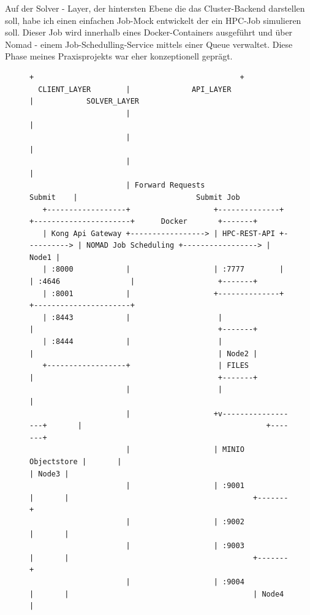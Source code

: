 \documentclass[12pt]{article}
\begin{document}
Auf der Solver - Layer, der hintersten Ebene die das Cluster-Backend darstellen soll, habe ich einen einfachen Job-Mock entwickelt der ein HPC-Job simulieren soll. Dieser Job wird innerhalb eines Docker-Containers ausgeführt und über Nomad - einem Job-Schedulling-Service mittels einer Queue verwaltet. Diese Phase meines Praxisprojekts war eher konzeptionell geprägt.

\begin{figure}[h!]
  \centering
  \begin{Verbatim}[fontsize=\tiny,frame=single]
                      +                                               +
  CLIENT_LAYER        |              API_LAYER                        |            SOLVER_LAYER
                      |                                               |
                      |                                               |
                      |                                               |
                      | Forward Requests                    Submit    |                           Submit Job
   +------------------+                   +--------------+            +----------------------+      Docker       +-------+
   | Kong Api Gateway +-----------------> | HPC-REST-API +----------> | NOMAD Job Scheduling +-----------------> | Node1 |
   | :8000            |                   | :7777        |            | :4646                |                   +-------+
   | :8001            |                   +--------------+            +----------------------+
   | :8443            |                    |                          |                                          +-------+
   | :8444            |                    |                          |                                          | Node2 |
   +------------------+                    | FILES                    |                                          +-------+
                      |                    |                          |
                      |                   +v------------------+       |                                          +-------+
                      |                   | MINIO Objectstore |       |                                          | Node3 |
                      |                   | :9001             |       |                                          +-------+
                      |                   | :9002             |       |
                      |                   | :9003             |       |                                          +-------+
                      |                   | :9004             |       |                                          | Node4 |

\end{Verbatim}
\end{figure}
\end{document}
